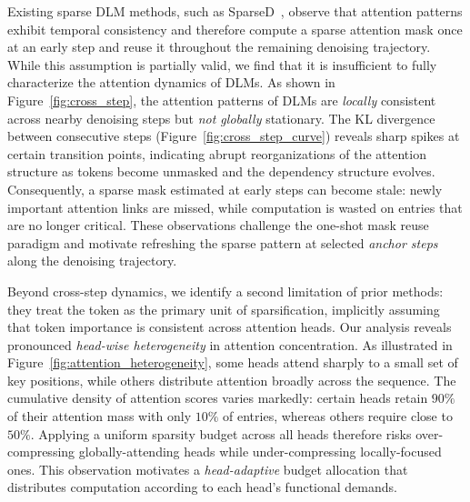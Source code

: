 Existing sparse DLM methods, such as SparseD~\citep{wang2025sparsed}, observe that attention patterns exhibit temporal consistency and therefore compute a sparse attention mask once at an early step and reuse it throughout the remaining denoising trajectory. While this assumption is partially valid, we find that it is insufficient to fully characterize the attention dynamics of DLMs. As shown in Figure~\ref{fig:cross_step}, the attention patterns of DLMs are \emph{locally} consistent across nearby denoising steps but \emph{not globally} stationary. The KL divergence between consecutive steps (Figure~\ref{fig:cross_step_curve}) reveals sharp spikes at certain transition points, indicating abrupt reorganizations of the attention structure as tokens become unmasked and the dependency structure evolves. Consequently, a sparse mask estimated at early steps can become stale: newly important attention links are missed, while computation is wasted on entries that are no longer critical. These observations challenge the one-shot mask reuse paradigm and motivate refreshing the sparse pattern at selected \emph{anchor steps} along the denoising trajectory.

Beyond cross-step dynamics, we identify a second limitation of prior methods: they treat the token as the primary unit of sparsification, implicitly assuming that token importance is consistent across attention heads. Our analysis reveals pronounced \emph{head-wise heterogeneity} in attention concentration. As illustrated in Figure~\ref{fig:attention_heterogeneity}, some heads attend sharply to a small set of key positions, while others distribute attention broadly across the sequence. The cumulative density of attention scores varies markedly: certain heads retain $90\%$ of their attention mass with only $10\%$ of entries, whereas others require close to $50\%$. Applying a uniform sparsity budget across all heads therefore risks over-compressing globally-attending heads while under-compressing locally-focused ones. This observation motivates a \emph{head-adaptive} budget allocation that distributes computation according to each head's functional demands.

